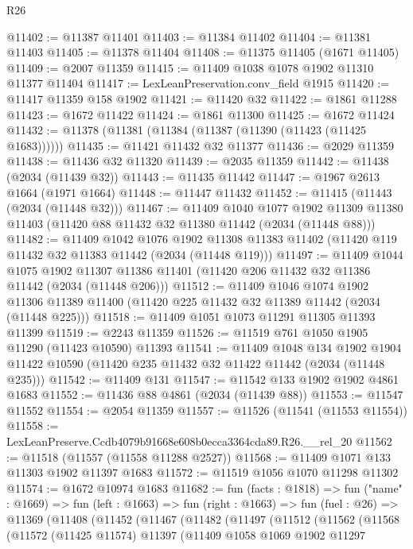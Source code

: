 \begin{lexlean}{R26}
\begin{coremodule}
@11402 := @11387 @11401
@11403 := @11384 @11402
@11404 := @11381 @11403
@11405 := @11378 @11404
@11408 := @11375 @11405 (@1671 @11405)
@11409 := @2007 @11359
@11415 := @11409 @1038 @1078 @1902 @11310 @11377 @11404
@11417 := LexLeanPreservation.conv_field @1915
@11420 := @11417 @11359 @158 @1902
@11421 := @11420 @32
@11422 := @1861 @11288
@11423 := @1672 @11422
@11424 := @1861 @11300
@11425 := @1672 @11424
@11432 := @11378 (@11381 (@11384 (@11387 (@11390 (@11423 (@11425 @1683))))))
@11435 := @11421 @11432 @32 @11377
@11436 := @2029 @11359
@11438 := @11436 @32 @11320
@11439 := @2035 @11359
@11442 := @11438 (@2034 (@11439 @32))
@11443 := @11435 @11442
@11447 := @1967 @2613 @1664 (@1971 @1664)
@11448 := @11447 @11432
@11452 := @11415 (@11443 (@2034 (@11448 @32)))
@11467 := @11409
    @1040
    @1077
    @1902
    @11309
    @11380
    @11403
    (@11420 @88 @11432 @32 @11380 @11442 (@2034 (@11448 @88)))
@11482 := @11409
    @1042
    @1076
    @1902
    @11308
    @11383
    @11402
    (@11420 @119 @11432 @32 @11383 @11442 (@2034 (@11448 @119)))
@11497 := @11409
    @1044
    @1075
    @1902
    @11307
    @11386
    @11401
    (@11420 @206 @11432 @32 @11386 @11442 (@2034 (@11448 @206)))
@11512 := @11409
    @1046
    @1074
    @1902
    @11306
    @11389
    @11400
    (@11420 @225 @11432 @32 @11389 @11442 (@2034 (@11448 @225)))
@11518 := @11409 @1051 @1073 @11291 @11305 @11393 @11399
@11519 := @2243 @11359
@11526 := @11519 @761 @1050 @1905 @11290 (@11423 @10590) @11393
@11541 := @11409
    @1048
    @134
    @1902
    @1904
    @11422
    @10590
    (@11420 @235 @11432 @32 @11422 @11442 (@2034 (@11448 @235)))
@11542 := @11409 @131
@11547 := @11542 @133 @1902 @1902 @4861 @1683
@11552 := @11436 @88 @4861 (@2034 (@11439 @88))
@11553 := @11547 @11552
@11554 := @2054 @11359
@11557 := @11526 (@11541 (@11553 @11554))
@11558 := LexLeanPreserve.Ccdb4079b91668e608b0ecca3364cda89.R26.__rel_20
@11562 := @11518 (@11557 (@11558 @11288 @2527))
@11568 := @11409 @1071 @133 @11303 @1902 @11397 @1683
@11572 := @11519 @1056 @1070 @11298 @11302
@11574 := @1672 @10974 @1683
@11682 := fun (facts : @1818) =>
  fun ("name" : @1669) =>
  fun (left : @1663) =>
  fun (right : @1663) =>
  fun (fuel : @26) =>
  @11369
    (@11408
      (@11452
        (@11467
          (@11482
            (@11497
              (@11512
                (@11562
                  (@11568
                    (@11572
                      (@11425 @11574)
                      @11397
                      (@11409
                        @1058
                        @1069
                        @1902
                        @11297

\end{coremodule}
\end{lexlean}
